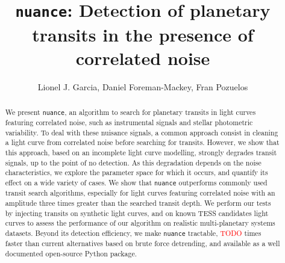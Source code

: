 \documentclass{aastex631}
\newcommand{\nuance}{\texttt{nuance}}
\newcommand{\TODO}{\textcolor{red}{TODO}}
\begin{document}
\title{\texttt{nuance}: Detection of planetary transits in the presence of correlated noise}

\author{Lionel J. Garcia, Daniel Foreman-Mackey, Fran Pozuelos}

\begin{abstract}
    We present \nuance{}, an algorithm to search for planetary transits in light curves featuring correlated noise, such as instrumental signals and stellar photometric variability. To deal with these nuisance signals, a common approach consist in cleaning a light curve from correlated noise before searching for transits. However, we show that this approach, based on an incomplete light curve modelling, strongly degrades transit signals, up to the point of no detection. As this degradation depends on the noise characteristics, we explore the parameter space for which it occurs, and quantify its effect on a wide variety of cases. We show that \nuance{} outperforms commonly used transit search algorithms, especially for light curves featuring correlated noise with an amplitude three times greater than the searched transit depth. We perform our tests by injecting transits on synthetic light curves, and on known TESS candidates light curves to assess the performance of our algorithm on realistic multi-planetary systems datasets. Beyond its detection efficiency, we make \nuance{} tractable, \TODO{} times faster than current alternatives based on brute force detrending, and available as a well documented open-source Python package.
\end{abstract}

\end{document}
